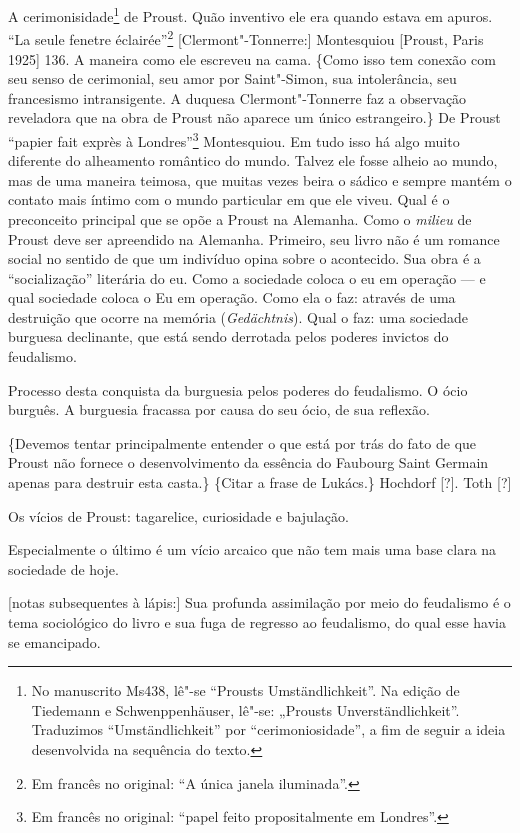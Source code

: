 A cerimonisidade\footnote{No manuscrito Ms438, lê"-se ``Prousts
  Umständlichkeit''. Na edição de Tiedemann e Schwenppenhäuser, lê"-se:
  „Prousts Unverständlichkeit”. Traduzimos ``Umständlichkeit'' por
  ``cerimoniosidade'', a fim de seguir a ideia desenvolvida na sequência
  do texto. \versal{[N. T.]}} de Proust. Quão inventivo ele era quando estava em apuros.
``La seule fenetre éclairée''\footnote{Em francês no original: ``A
  única janela iluminada''. \versal{[N. T.]}} {[}Clermont"-Tonnerre:{]} Montesquiou
{[}Proust, Paris 1925{]} 136. A maneira como ele escreveu na cama.
\{Como isso tem conexão com seu senso de cerimonial, seu amor por
Saint"-Simon, sua intolerância, seu francesismo intransigente. A duquesa
Clermont"-Tonnerre faz a observação reveladora que na obra de Proust não
aparece um único estrangeiro.\} De Proust ``papier fait exprès à
Londres''\footnote{Em francês no original: ``papel feito %
  propositalmente em Londres''. \versal{[N. T.]}} Montesquiou. Em tudo isso há algo muito
diferente do alheamento romântico do mundo. Talvez ele fosse alheio ao
mundo, mas de uma maneira teimosa, que muitas vezes beira o sádico e
sempre mantém o contato mais íntimo com o mundo particular em que ele
viveu. Qual é o preconceito principal que se opõe a Proust na Alemanha.
Como o \emph{milieu} de Proust deve ser apreendido na Alemanha.
Primeiro, seu livro não é um romance social no sentido de que um
indivíduo opina sobre o acontecido. Sua obra é a ``socialização''
literária do eu. Como a sociedade coloca o eu em operação --- e qual
sociedade coloca o Eu em operação. Como ela o faz: através de uma
destruição que ocorre na memória (\emph{Gedächtnis}). Qual o faz: uma
sociedade burguesa declinante, que está sendo derrotada pelos poderes
invictos do feudalismo.

Processo desta conquista da burguesia pelos poderes do feudalismo. O
ócio burguês. A burguesia fracassa por causa do seu ócio, de sua
reflexão.

\{Devemos tentar principalmente entender o que está por trás do
fato de que Proust não fornece o desenvolvimento da essência do Faubourg
Saint Germain apenas para destruir esta casta.\} \{Citar a frase de
Lukács.\} Hochdorf {[}?{]}. Toth {[}?{]}

Os vícios de Proust: tagarelice, curiosidade e bajulação.

Especialmente o último é um vício arcaico que não tem mais uma base
clara na sociedade de hoje.

{[}notas subsequentes à lápis:{]} Sua profunda assimilação por meio do
feudalismo é o tema sociológico do livro e sua fuga de regresso ao
feudalismo, do qual esse havia se emancipado.

